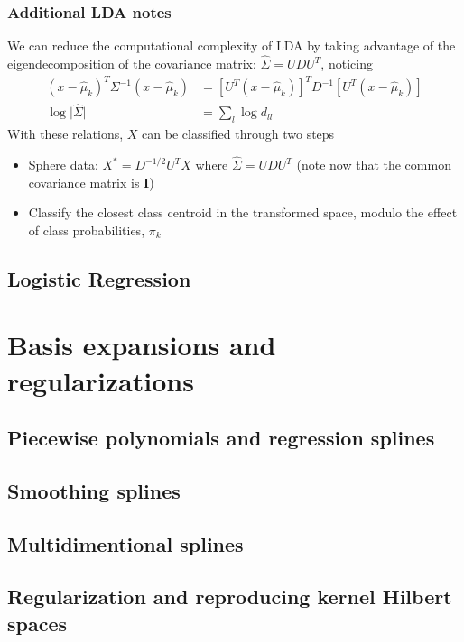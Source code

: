 \documentclass{article}
\newcommand{\abs}[1]{\lvert#1\rvert}
\begin{document}
\subsubsection{Additional LDA notes}
We can reduce the computational complexity of LDA by taking advantage of the eigendecomposition of the covariance matrix: $\hat{\Sigma} = UDU^T$, noticing
\begin{align*}
  (x - \hat{\mu}_k)^T \Sigma^{-1}(x - \hat{\mu}_k) &= [U^T(x - \hat{\mu}_k)]^T D^{-1}[U^T(x - \hat{\mu}_k)]\\
  \log\abs{\hat{\Sigma}} &= \sum_l\log d_{ll}
\end{align*}
With these relations, $X$ can be classified through two steps
\begin{itemize}
  \item Sphere data: $X^* = D^{-1/2}U^TX$ where $\hat{\Sigma} = UDU^T$ (note now that the common covariance matrix is $\mathbf{I}$)
  \item Classify the closest class centroid in the transformed space, modulo the effect of class probabilities, $\pi_k$
\end{itemize}

\subsection{Logistic Regression}



\section{Basis expansions and regularizations}
\subsection{Piecewise polynomials and regression splines}
\subsection{Smoothing splines}
\subsection{Multidimentional splines}
\subsection{Regularization and reproducing kernel Hilbert spaces}
\end{document}
